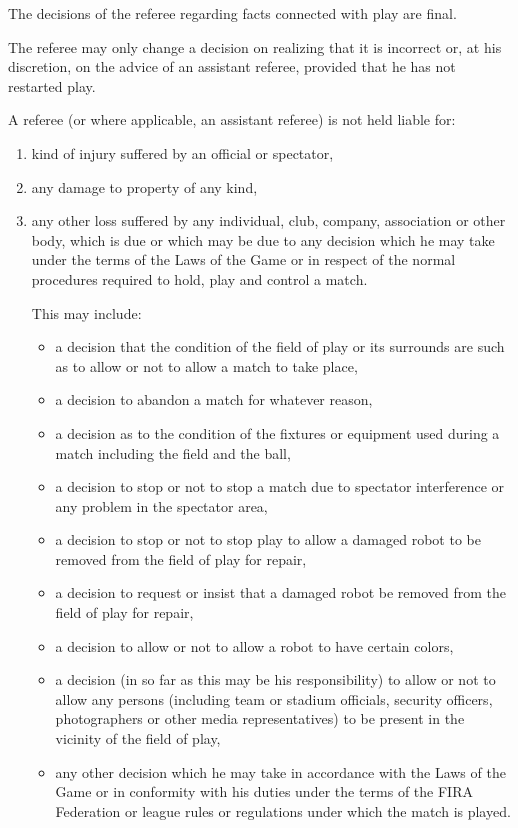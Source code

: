 \documentclass[12pt]{hurocup}
\begin{document}
\begin{lawlist}[G]
\item The decisions of the referee regarding facts connected with play
  are final.

\item The referee may only change a decision on realizing that it is
  incorrect or, at his discretion, on the advice of an assistant
  referee, provided that he has not restarted play.

\item A referee (or where applicable, an assistant referee) is not
  held liable for: 
  \begin{enumerate}
    \item kind of injury suffered by an official or spectator,
    \item any damage to property of any kind,
    \item any other loss suffered by any individual, club, company,
      association or other body, which is due or which may be due to
      any decision which he may take under the terms of the Laws of
      the Game or in respect of the normal procedures required to
      hold, play and control a match.

      This may include:

      \begin{itemize}
      \item a decision that the condition of the field of play or its
        surrounds are such as to allow or not to allow a match to take
        place,
      \item a decision to abandon a match for whatever reason,
      \item a decision as to the condition of the fixtures or
        equipment used during a match including the field and the ball,
      \item a decision to stop or not to stop a match due to spectator
        interference or any problem in the spectator area,
      \item a decision to stop or not to stop play to allow a damaged
        robot to be removed from the field of play for repair,
      \item a decision to request or insist that a damaged robot be
        removed from the field of play for repair,
      \item a decision to allow or not to allow a robot to have
        certain colors,
      \item a decision (in so far as this may be his responsibility)
        to allow or not to allow any persons (including team or
        stadium officials, security officers, photographers or other
        media representatives) to be present in the vicinity of the
        field of play,
      \item any other decision which he may take in accordance with
        the Laws of the Game or in conformity with his duties under
        the terms of the FIRA Federation or league rules or
        regulations under which the match is played.
      \end{itemize}
    \end{enumerate}
\end{lawlist}
                                
\end{document}
